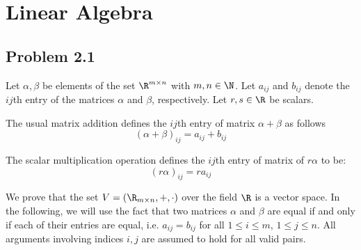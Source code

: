 \documentclass{homework}
\begin{document}
\section{Linear Algebra}
\subsection{Problem 2.1}
\begin{letterenum}
    \item Let $\alpha, \beta$ be elements of the set $\R^{m \times n}$ with
        $m, n \in \N$. Let $a_{ij}$ and $b_{ij}$ denote the $ij$th entry of 
        the matrices $\alpha$ and $\beta$, respectively. Let $r,s \in \R$ be
        scalars. 

        The usual matrix addition defines the $ij$th entry of matrix $\alpha + \beta$
        as follows
        \begin{equation}
            (\alpha + \beta)_{ij} = a_{ij} + b_{ij}
        \end{equation}

        The scalar multiplication operation defines the $ij$th entry of matrix
        of $r\alpha$ to be:
        \begin{equation}
            (r\alpha)_{ij} = r a_{ij}
        \end{equation}

        We prove that the set $V = (\R_{m\times n}, +, \cdot)$ over the field
        $\R$ is a vector space. In the following, we will use the fact that two matrices 
        $\alpha$ and $\beta$ are equal if and only if each of their entries are equal, i.e.
        $a_{ij} = b_{ij}$ for all $1 \leq i \leq m$, $1 \leq j \leq n$. All arguments involving
        indices $i,j$ are assumed to hold for all valid pairs.


\end{letterenum}
\end{document}
